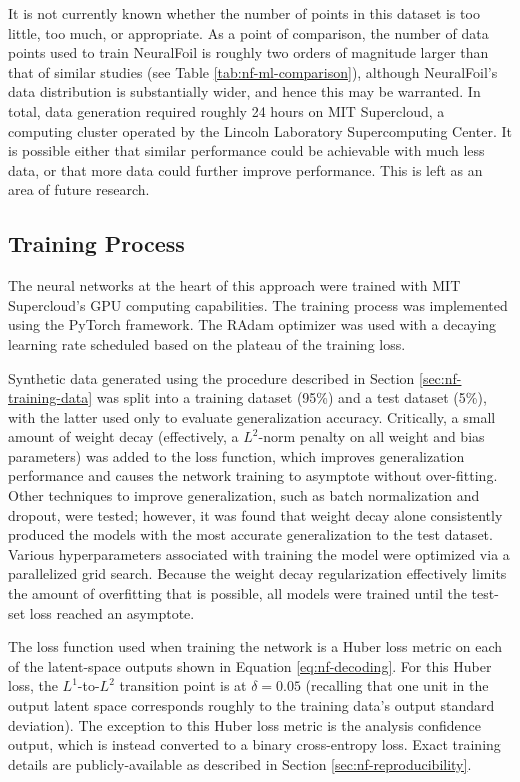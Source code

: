 It is not currently known whether the number of points in this dataset is too little, too much, or appropriate. As a point of comparison, the number of data points used to train NeuralFoil is roughly two orders of magnitude larger than that of similar studies (see Table \ref{tab:nf-ml-comparison}), although NeuralFoil's data distribution is substantially wider, and hence this may be warranted. In total, data generation required roughly 24 hours on MIT Supercloud, a computing cluster operated by the Lincoln Laboratory Supercomputing Center. It is possible either that similar performance could be achievable with much less data, or that more data could further improve performance. This is left as an area of future research.

\subsection{Training Process}
\label{sec:nf-training-process}

The neural networks at the heart of this approach were trained with MIT Supercloud's GPU computing capabilities. The training process was implemented using the PyTorch \cite{paszke_pytorch_2019} framework. The RAdam optimizer \cite{liu_variance_2019} was used with a decaying learning rate scheduled based on the plateau of the training loss.

Synthetic data generated using the procedure described in Section \ref{sec:nf-training-data} was split into a training dataset (95\%) and a test dataset (5\%), with the latter used only to evaluate generalization accuracy. Critically, a small amount of weight decay (effectively, a $L^2$-norm penalty on all weight and bias parameters) was added to the loss function, which improves generalization performance and causes the network training to asymptote without over-fitting. Other techniques to improve generalization, such as batch normalization and dropout, were tested; however, it was found that weight decay alone consistently produced the models with the most accurate generalization to the test dataset. Various hyperparameters associated with training the model were optimized via a parallelized grid search. Because the weight decay regularization effectively limits the amount of overfitting that is possible, all models were trained until the test-set loss reached an asymptote.

The loss function used when training the network is a Huber loss metric on each of the latent-space outputs shown in Equation \ref{eq:nf-decoding}. For this Huber loss, the $L^1$-to-$L^2$ transition point is at $\delta=0.05$ (recalling that one unit in the output latent space corresponds roughly to the training data's output standard deviation). The exception to this Huber loss metric is the analysis confidence output, which is instead converted to a binary cross-entropy loss. Exact training details are publicly-available as described in Section \ref{sec:nf-reproducibility}.


